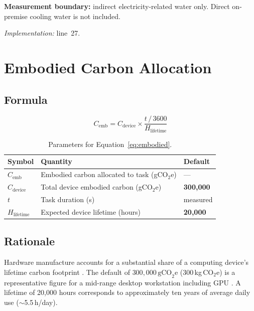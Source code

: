 \documentclass[12pt]{article}
\begin{document}
\textbf{Measurement boundary:} indirect electricity-related water only. Direct
on-premise cooling water is not included.

\textit{Implementation:} line~27.

\section{Embodied Carbon Allocation}

\subsection*{Formula}

\begin{equation}
  C_{\text{emb}} = C_{\text{device}} \times
    \frac{t\,/\,3600}{H_{\text{lifetime}}}
  \label{eq:embodied}
\end{equation}

\begin{table}[h!]
\centering
\begin{tabular}{@{}lll@{}}
\toprule
Symbol & Quantity & Default \\
\midrule
$C_{\text{emb}}$      & Embodied carbon allocated to task (gCO$_2$e)   & --- \\
$C_{\text{device}}$   & Total device embodied carbon (gCO$_2$e)         & \textbf{300,000} \\
$t$                   & Task duration (s)                               & measured \\
$H_{\text{lifetime}}$ & Expected device lifetime (hours)                & \textbf{20,000} \\
\bottomrule
\end{tabular}
\caption{Parameters for Equation~\ref{eq:embodied}.}
\end{table}

\subsection*{Rationale}

Hardware manufacture accounts for a substantial share of a computing device's
lifetime carbon footprint \citep{gupta2022}. The default of
$300{,}000\,\text{gCO}_2\text{e}$ (300\,kg\,CO$_2$e) is a representative
figure for a mid-range desktop workstation including GPU
\citep{malmodin2018}. A lifetime of 20,000 hours corresponds to approximately
ten years of average daily use ($\sim$5.5\,h/day).
\end{document}
